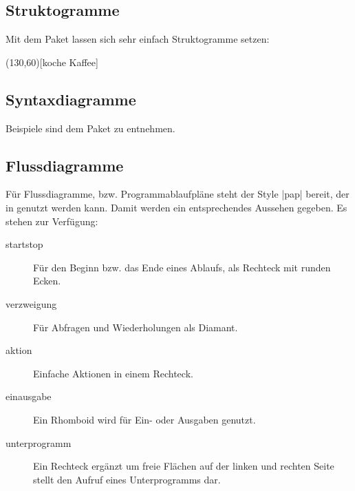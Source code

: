 \subsection{Struktogramme}
Mit dem Paket  lassen sich sehr einfach Struktogramme setzen:

\begin{example}[gobble=4]
    \begin{struktogramm}(130,60)[koche Kaffee]
    \change
    \ifend
    \whileend
    \end{struktogramm}
\end{example}

\subsection{Syntaxdiagramme}
Beispiele sind dem Paket  zu entnehmen.

\subsection{Flussdiagramme}
Für Flussdiagramme, bzw. Programmablaufpläne steht der Style \verbcode|pap| bereit, der in  genutzt werden kann. Damit werden  ein entsprechendes Aussehen gegeben. Es stehen zur Verfügung:
\begin{description}
    \item[startstop] Für den Beginn bzw. das Ende eines Ablaufs, als Rechteck mit runden Ecken.
    \item[verzweigung] Für Abfragen und Wiederholungen als Diamant.
    \item[aktion] Einfache Aktionen in einem Rechteck.
    \item[einausgabe] Ein Rhomboid wird für Ein- oder Ausgaben genutzt.
    \item[unterprogramm] Ein Rechteck ergänzt um freie Flächen auf der linken und rechten Seite stellt den Aufruf eines Unterprogramms dar.
\end{description}

